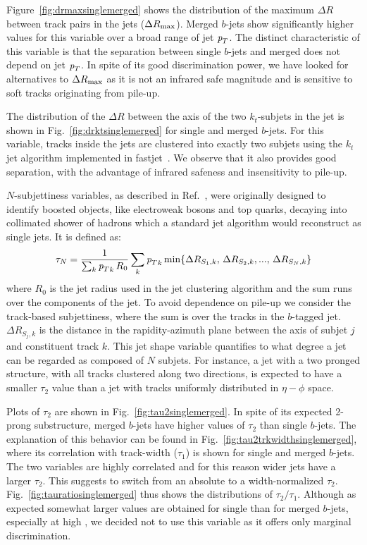 Figure~\ref{fig:drmaxsinglemerged} shows the distribution of the maximum $\Delta R$ between track pairs in the jets ($\Delta R_{\rm max}$). Merged $b$-jets show significantly higher values for this variable over a broad range of jet ${\emph{p}_{T}}$. The distinct characteristic of this variable is that the separation between single $b$-jets and merged does not depend on jet ${\emph{p}_{T}}$. In spite of its good discrimination power, we have looked for alternatives to $\Delta R_{\rm max}$ as it is not an infrared safe magnitude and is sensitive to soft tracks originating from pile-up. 

The distribution of the $\Delta R$ between the axis of the two $k_t$-subjets in the jet is shown in Fig.~\ref{fig:drktsinglemerged} for single and merged $b$-jets. For this variable, tracks inside the jets are clustered into exactly two subjets using the $k_t$ jet algorithm implemented in fastjet~\cite{fastjet}. We observe that it also provides good separation, with the advantage of infrared safeness and insensitivity to pile-up. %

$N$-subjettiness variables, as described in Ref.~\cite{nsubjettiness}, were originally designed to identify boosted objects, like electroweak bosons and top quarks, decaying into collimated shower of hadrons which a standard jet algorithm would reconstruct as single jets. It is defined as:
\begin{equation*} 
\tau_N = \frac{1}{\sum_k {{\emph{p}_{T}}}_k\,R_0} \sum_k {{\emph{p}_{T}}}_k \min \{ \Delta R_{S_1,k},\,\Delta R_{S_2,k},...,\,\Delta R_{S_N,k} \}
\end{equation*} 
where $R_0$ is the jet radius used in the jet clustering algorithm and the sum runs over the components of the jet. To avoid dependence on pile-up we consider the track-based subjettiness, where the sum 
 is over the tracks in the $b$-tagged jet. $\Delta R_{S_j,k} $ is the distance in the rapidity-azimuth plane between the axis of subjet $j$ and constituent track $k$. This jet shape variable quantifies to what degree a jet can be regarded as composed of $N$ subjets. For instance, a jet with a two pronged structure, with all tracks clustered along two directions, is expected to have a smaller $\tau_2$ value than a jet with tracks uniformly distributed in $\eta-\phi$ space.

Plots of $ \tau_2$ are shown in Fig.~\ref{fig:tau2singlemerged}. In spite of its expected 2-prong substructure, merged $b$-jets have higher values of $ \tau_2$ than single $b$-jets. The explanation of this behavior can be found in Fig.~\ref{fig:tau2trkwidthsinglemerged}, where its correlation with  track-width ($\tau_1$) is shown for single and merged $b$-jets. The two variables are highly correlated and for this reason wider jets  have a larger $ \tau_2$. This suggests to switch from an absolute to a width-normalized
$\tau_2$. Fig.~\ref{fig:tauratiosinglemerged} thus shows the distributions of $\tau_2/\tau_1$. Although as expected somewhat larger values are obtained for single than for merged $b$-jets, especially at high \pt, we decided not to use this variable as it offers only marginal discrimination. 

